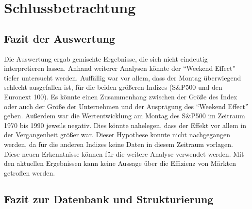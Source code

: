 \section{Schlussbetrachtung}

\subsection{Fazit der Auswertung}

Die Auswertung ergab gemischte Ergebnisse, die sich nicht eindeutig interpretieren lassen. Anhand weiterer Analysen könnte der \enquote{Weekend Effect} tiefer untersucht werden. Auffällig war vor allem, dass der Montag überwiegend schlecht ausgefallen ist, für die beiden größeren Indizes (S\&P500 und den Euronext 100). Es könnte einen Zusammenhang zwischen der Größe des Index oder auch der Größe der Unternehmen und der Ausprägung des \enquote{Weekend Effect} geben. Außerdem war die Wertentwicklung am Montag des S\&P500 im Zeitraum 1970 bis 1990 jeweils negativ. Dies könnte nahelegen, dass der Effekt vor allem in der Vergangenheit größer war. Dieser Hypothese konnte nicht nachgegangen werden, da für die anderen Indizes keine Daten in diesem Zeitraum vorlagen. Diese neuen Erkenntnisse können für die weitere Analyse verwendet werden. Mit den aktuellen Ergebnissen kann keine Aussage über die Effizienz von Märkten getroffen werden.

\subsection{Fazit zur Datenbank und Strukturierung}



